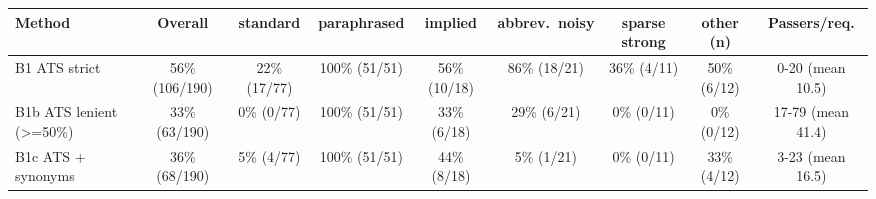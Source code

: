 \begin{tabular}{lcccccccc}
\toprule
Method & Overall & standard & paraphrased & implied & abbrev.\ noisy & sparse strong & other (n) & Passers/req. \\
\midrule
B1 ATS strict & 56\% (106/190) & 22\% (17/77) & 100\% (51/51) & 56\% (10/18) & 86\% (18/21) & 36\% (4/11) & 50\% (6/12) & 0-20 (mean 10.5) \\
B1b ATS lenient (>=50\%) & 33\% (63/190) & 0\% (0/77) & 100\% (51/51) & 33\% (6/18) & 29\% (6/21) & 0\% (0/11) & 0\% (0/12) & 17-79 (mean 41.4) \\
B1c ATS + synonyms & 36\% (68/190) & 5\% (4/77) & 100\% (51/51) & 44\% (8/18) & 5\% (1/21) & 0\% (0/11) & 33\% (4/12) & 3-23 (mean 16.5) \\
\bottomrule
\end{tabular}
